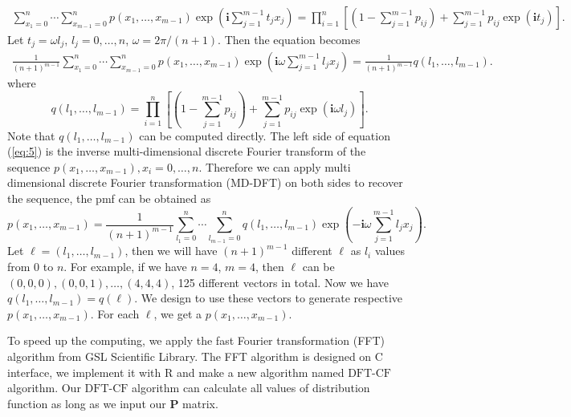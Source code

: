 \documentclass[12pt]{article}
\newcommand{\Pmat}{\mathbf{P}}
\newcommand{\ivec}{{\boldsymbol{i}}}
\newcommand{\dft}{{\textrm{DFT-CF}}}
\begin{document}
\begin{align*}
\sum_{x_1 = 0}^{n}\cdots \sum_{x_{m-1} = 0}^n p(x_1,\ldots,x_{m-1})\exp\left(\ivec\sum_{j=1}^{m-1}t_jx_j\right)= \prod_{i=1}^{n}\left[(1 - \sum_{j=1}^{m-1}p_{ij})+\sum_{j=1}^{m-1}p_{ij}\exp(\ivec t_j)\right].
\end{align*}
Let $t_j = \omega l_j$, $l_j = 0, \ldots, n$, $\omega = 2\pi/(n+1)$. Then the equation becomes
\begin{align}\label{eq:5}
\frac{1}{(n+1)^{m-1}} \sum_{x_1 = 0}^{n}\cdots \sum_{x_{m-1} = 0}^n p(x_1,\ldots,x_{m-1}) \exp\left(\ivec\omega\sum_{j=1}^{m-1}l_j x_j\right)= \frac{1}{(n+1)^{m-1}} q(l_1, \ldots, l_{m-1}).
\end{align}
where
$$ 
q(l_1, \ldots, l_{m-1})=\prod_{i=1}^{n}\left[(1 - \sum_{j=1}^{m-1}p_{ij})+\sum_{j=1}^{m-1}p_{ij}\exp(\ivec \omega l_j)\right].
$$	
Note that $q(l_1, \ldots, l_{m-1})$ can be computed directly. The left side of equation (\ref{eq:5}) is the inverse multi-dimensional discrete Fourier transform of the sequence $ p(x_1,\ldots,x_{m-1}), x_i = 0 , \dots, n$. Therefore we can apply multi dimensional discrete Fourier transformation (MD-DFT) on both sides to recover the sequence, the pmf can be obtained as
\begin{equation}\label{eq:6}
p(x_1, \ldots, x_{m-1}) = \frac{1}{(n+1)^{m-1}}\sum_{l_1 = 0}^{n}\cdots \sum_{l_{m-1} = 0}^n q(l_1, \ldots, l_{m-1}) \exp\left(-\ivec\omega\sum_{j=1}^{m-1}l_j x_j\right).
\end{equation}
Let $\ell = (l_1,\dots,l_{m-1})$, then we will have $(n
+1)^{m-1}$ different $\ell$ as $l_i$ values from $0$ to $n$. For example, if we have $n=4$, $m=4$, then $\ell$ can be $(0, 0, 0), (0, 0, 1), \dots, (4, 4, 4)$, 125 different vectors in total. Now we have $q(l_1,\dots,l_{m-1}) = q(\ell)$. We design to use these vectors to generate respective $p(x_1,\dots,x_{m-1})$. For each $\ell$, we get a $p(x_1,\dots,x_{m-1})$.

To speed up the computing, we apply the fast Fourier transformation (FFT) algorithm  from GSL Scientific Library. The FFT algorithm is designed on C interface, we implement it with R and make a new algorithm named $\dft$ algorithm. Our $\dft$ algorithm can calculate all values of distribution function as long as we input our $\Pmat$ matrix.



\end{document}
